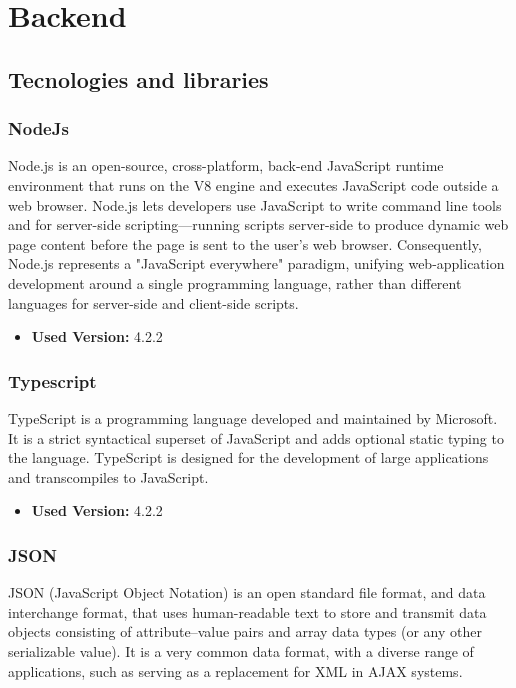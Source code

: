 \section{Backend}

\subsection{Tecnologies and libraries}

\subsubsection{NodeJs}
Node.js is an open-source, cross-platform, back-end JavaScript runtime environment that runs on the V8 engine and executes JavaScript code outside a web browser. Node.js lets developers use JavaScript to write command line tools and for server-side scripting—running scripts server-side to produce dynamic web page content before the page is sent to the user's web browser. Consequently, Node.js represents a "JavaScript everywhere" paradigm, unifying web-application development around a single programming language, rather than different languages for server-side and client-side scripts.

\begin{itemize}
    \item \textbf{Used Version:} 4.2.2 
\end{itemize}

\subsubsection{Typescript}
TypeScript is a programming language developed and maintained by Microsoft. It is a strict syntactical superset of JavaScript and adds optional static typing to the language. TypeScript is designed for the development of large applications and transcompiles to JavaScript. 
   
    \begin{itemize}
        \item \textbf{Used Version:} 4.2.2 
    \end{itemize}

\subsubsection{JSON}
JSON (JavaScript Object Notation) is an open standard file format, and data interchange format, that uses human-readable text to store and transmit data objects consisting of attribute–value pairs and array data types (or any other serializable value). It is a very common data format, with a diverse range of applications, such as serving as a replacement for XML in AJAX systems.


